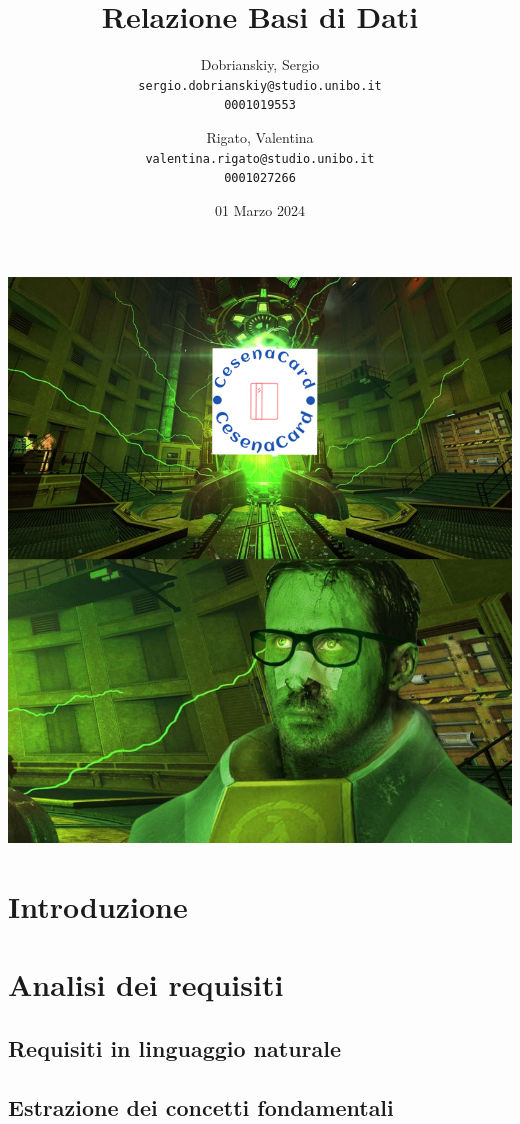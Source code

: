 \documentclass{article}
\title{Relazione Basi di Dati}
\author{
  Dobrianskiy, Sergio \\
  \texttt{sergio.dobrianskiy@studio.unibo.it}\\
  \texttt{0001019553}
  \and
  Rigato, Valentina\\
  \texttt{valentina.rigato@studio.unibo.it}\\
  \texttt{0001027266}
}
\date{01 Marzo 2024}
\begin{document}
 
\maketitle
\includegraphics[width=0.95\columnwidth]{CesenaCard2.png}
\newpage

\tableofcontents
\clearpage

\section{Introduzione}



\section{Analisi dei requisiti}

\subsection{Requisiti in linguaggio naturale}


\subsection{Estrazione dei concetti fondamentali}

\end{document}
